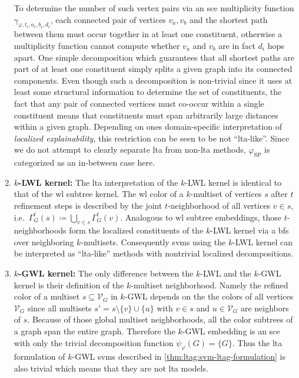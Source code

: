 \begin{enumerate}[label=\textbf{\arabic*.}]
		To determine the number of such vertex pairs via an \ac{sce} multiplicity function $\gamma_{\varphi, t_i, a_i, b_i, d_i}$, each connected pair of vertices $v_a, v_b$ and the shortest path between them must occur together in at least one constituent, otherwise a multiplicity function cannot compute whether $v_a$ and $v_b$ are in fact $d_i$ hops apart.
		One simple decomposition which guarantees that all shortest paths are part of at least one constituent simply splits a given graph into its connected components.
		Even though such a decomposition is non-trivial since it uses at least some structural information to determine the set of constituents, the fact that any pair of connected vertices must co-occur within a single constituent means that constituents must span arbitrarily large distances within a given graph.
		Depending on ones domain-specific interpretation of \textit{localized explainability}, this restriction can be seen to be not ``\acs{lta}-like''.
		Since we do not attempt to clearly separate \ac{lta} from non-\acs{lta} methods, $\varphi_{\text{SP}}$ is categorized as an in-between case here.
	\item \textbf{$k$-LWL kernel:}
		The \ac{lta} interpretation of the $k$-LWL kernel is identical to that of the \ac{wl} subtree kernel.
		The \ac{wl} color of a $k$-multiset of vertices $s$ after $t$ refinement steps is described by the joint $t$-neighborhood of all vertices $v \in s$, i.e.\ $\Gamma_{G}^t(s) \coloneqq \bigcup_{v \in s} \Gamma_{G}^t(v)$.
		Analogous to \ac{wl} subtree embeddings, those $t$-neighborhoods form the localized constituents of the $k$-LWL kernel via a \ac{bfs} over neighboring $k$-multisets.
		Consequently \acp{svm} using the $k$-LWL kernel can be interpreted as ``\acs{lta}-like'' methods with nontrivial localized decompositions.\\
	\item \textbf{$k$-GWL kernel:}
		The only difference between the $k$-LWL and the $k$-GWL kernel is their definition of the $k$-multiset neighborhood.
		Namely the refined color of a multiset $s \subseteq \mathcal{V}_G$ in $k$-GWL depends on the the colors of all vertices $\mathcal{V}_G$ since all multisets $s' = s \setminus \{ v \} \cup \{ u \}$ with $v \in s$ and $u \in \mathcal{V}_G$ are neighbors of $s$.
		Because of those global multiset neighborhoods, all the color subtrees of a graph span the entire graph.
		Therefore the $k$-GWL embedding is an \ac{sce} with only the trivial decomposition function $\psi_{\varphi}(G) = \{ G \}$.
		Thus the \ac{lta} formulation of $k$-GWL \acp{svm} described in \cref{thm:ltag:svm-ltag-formulation} is also trivial which means that they are not \ac{lta} models.
\end{enumerate}

